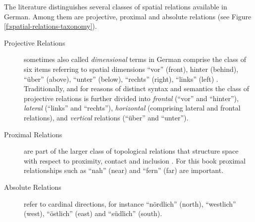 The literature distinguishes several classes of spatial relations 
available in German. Among them are projective, proximal and absolute relations
(see Figure \ref{f:spatial-relations-taxonomy}).
\begin{description}
\item[Projective Relations] sometimes also called \emph{dimensional} terms 
\citep{eschenbach2004functional,herskovits1986language} 
in German comprise the class of six items referring to spatial dimensions
``vor'' (front), hinter (behind), ``\"uber'' (above), ``unter'' (below), ``rechts'' (right), 
``links'' (left) \citep{tenbrink2007space,tenbrink2005localising,wunderlich1991lokale}. 
Traditionally, and for reasons of distinct syntax and semantics the
class of projective relations is further divided into \emph{frontal} (``vor'' 
and ``hinter''), \emph{lateral} (``links'' and ``rechts''), 
\emph{horizontal} (comprising lateral and frontal relations), and 
\emph{vertical} relations (``\"uber'' and ``unter''). 
\item[Proximal Relations] are part of the larger class of topological relations
that structure space with respect to proximity, contact and inclusion 
\citep{Grabowski1996prepositional}. For this book proximal relationships
such as ``nah'' (near) and ``fern'' (far) are important.
\item[Absolute Relations] refer to cardinal directions,
for instance ``n\"ordlich'' (north), ``westlich'' (west), ``\"ostlich'' (east) and
``s\"udlich'' (south).
\end{description}


